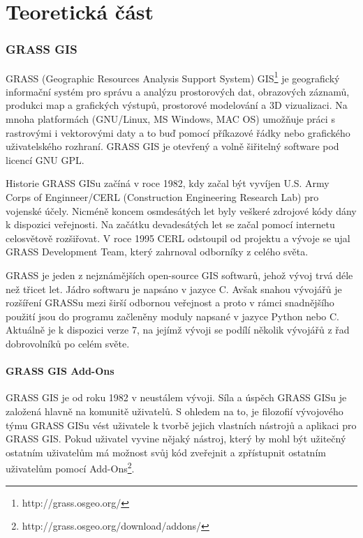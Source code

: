 \documentclass[12pt,a4paper]{article}
\begin{document}
\newpage
\part{Teoretická část}

\newpage
\section{GRASS GIS}
GRASS (Geographic Resources Analysis Support System) GIS\footnote{http://grass.osgeo.org/} je geografický informační systém pro správu a analýzu prostorových dat, obrazových záznamů, produkci map a grafických výstupů, prostorové modelování a 3D vizualizaci. Na mnoha platformách (GNU/Linux, MS Windows, MAC OS) umožňuje práci s rastrovými i vektorovými daty a to buď pomocí příkazové řádky nebo grafického uživatelského rozhraní. GRASS GIS je otevřený a volně šiřitelný software pod licencí GNU GPL.

Historie\cite{rukovet} GRASS GISu začíná v roce 1982, kdy začal být vyvíjen U.S. Army Corps of Enginneer/CERL (Construction Engineering Research Lab) pro vojenské účely. Nicméně koncem osmdesátých let byly veškeré zdrojové kódy dány k dispozici veřejnosti. Na začátku devadesátých let se začal pomocí internetu celosvětově rozšiřovat. V roce 1995 CERL odstoupil od projektu a vývoje se ujal GRASS Development Team, který zahrnoval odborníky z celého světa.

GRASS je jeden z nejznámějších open-source GIS softwarů, jehož vývoj trvá déle než třicet let. Jádro softwaru je napsáno v jazyce C. Avšak snahou vývojářů je rozšíření GRASSu mezi širší odbornou veřejnost a proto v rámci snadnějšího použití jsou do programu začleněny moduly napsané v jazyce Python nebo C. Aktuálně je k dispozici verze 7, na jejímž vývoji se podílí několik vývojářů z řad dobrovolníků po celém světe.

\subsection{GRASS GIS Add-Ons}
GRASS GIS je od roku 1982 v neustálem vývoji. Síla a úspěch GRASS GISu je založená hlavně na komunitě uživatelů. S ohledem na to, je filozofií vývojového týmu GRASS GISu vést uživatele k tvorbě jejich vlastních nástrojů a aplikaci pro GRASS GIS. Pokud uživatel vyvine nějaký nástroj, který by mohl být užitečný ostatním uživatelům má možnost svůj kód zveřejnit a zpřístupnit ostatním uživatelům pomocí Add-Ons\footnote{http://grass.osgeo.org/download/addons/}.
\end{document}
